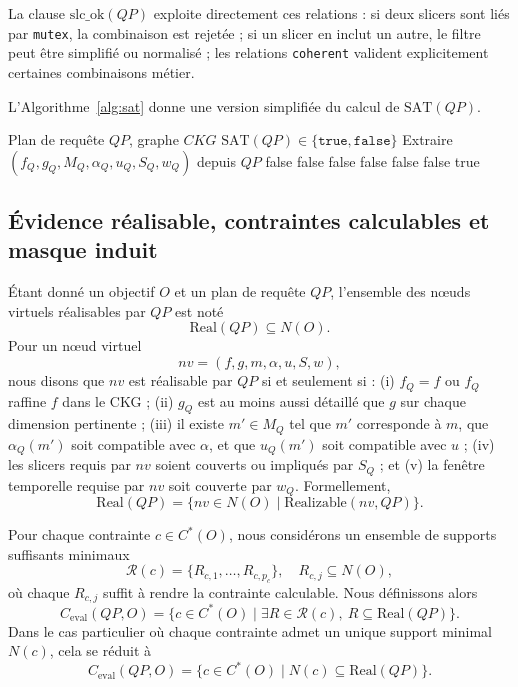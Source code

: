 \documentclass[journal]{IEEEtran}
\begin{document}
La clause $\mathrm{slc\_ok}(QP)$ exploite directement ces relations : si deux slicers sont liés par \texttt{mutex}, la combinaison est rejetée ; si un slicer en inclut un autre, le filtre peut être simplifié ou normalisé ; les relations \texttt{coherent} valident explicitement certaines combinaisons métier.

L'Algorithme~\ref{alg:sat} donne une version simplifiée du calcul de $\mathrm{SAT}(QP)$.

\begin{algorithm}[!t]
\caption{Vérification de la validité contextuelle $\mathrm{SAT}(QP)$}
\label{alg:sat}
\begin{algorithmic}[1]
\REQUIRE Plan de requête $QP$, graphe $CKG$
\ENSURE $\mathrm{SAT}(QP)\in\{\texttt{true},\texttt{false}\}$
\STATE Extraire $(f_Q,g_Q,M_Q,\alpha_Q,u_Q,S_Q,w_Q)$ depuis $QP$
 \RETURN false \ENDIF
{} \RETURN false \ENDIF
{} \RETURN false \ENDIF
{} \RETURN false \ENDIF
{} \RETURN false \ENDIF
{} \RETURN false \ENDIF
\RETURN true
\end{algorithmic}
\end{algorithm}

\subsection{Évidence réalisable, contraintes calculables et masque induit}

Étant donné un objectif $O$ et un plan de requête $QP$, l'ensemble des nœuds virtuels réalisables par $QP$ est noté
\[
\mathrm{Real}(QP)\subseteq N(O).
\]
Pour un nœud virtuel
\[
nv=(f,g,m,\alpha,u,S,w),
\]
nous disons que $nv$ est réalisable par $QP$ si et seulement si : (i) $f_Q=f$ ou $f_Q$ raffine $f$ dans le CKG ; (ii) $g_Q$ est au moins aussi détaillé que $g$ sur chaque dimension pertinente ; (iii) il existe $m'\in M_Q$ tel que $m'$ corresponde à $m$, que $\alpha_Q(m')$ soit compatible avec $\alpha$, et que $u_Q(m')$ soit compatible avec $u$ ; (iv) les slicers requis par $nv$ soient couverts ou impliqués par $S_Q$ ; et (v) la fenêtre temporelle requise par $nv$ soit couverte par $w_Q$. Formellement,
\[
\mathrm{Real}(QP)=\{nv\in N(O)\mid \mathrm{Realizable}(nv,QP)\}.
\]

Pour chaque contrainte $c\in C^*(O)$, nous considérons un ensemble de supports suffisants minimaux
\[
\mathcal{R}(c)=\{R_{c,1},\dots,R_{c,p_c}\},\quad R_{c,j}\subseteq N(O),
\]
où chaque $R_{c,j}$ suffit à rendre la contrainte calculable. Nous définissons alors
\[
C_{\mathrm{eval}}(QP,O)=\{c\in C^*(O)\mid \exists R\in \mathcal{R}(c),\ R\subseteq \mathrm{Real}(QP)\}.
\]
Dans le cas particulier où chaque contrainte admet un unique support minimal $N(c)$, cela se réduit à
\[
C_{\mathrm{eval}}(QP,O)=\{c\in C^*(O)\mid N(c)\subseteq \mathrm{Real}(QP)\}.
\]
\end{document}
